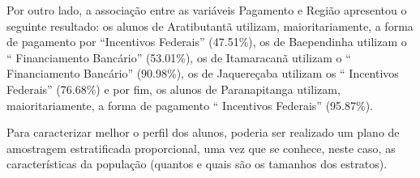 	Por outro lado, a associação entre as variáveis Pagamento e Região
	apresentou o seguinte resultado: os alunos de Aratibutantã utilizam,
	maioritariamente, a forma de pagamento por ``Incentivos Federais''
    (\num{47,51}\%), os de Baependinha utilizam o
	`` Financiamento Bancário'' (\num{53,01}\%), os
	de Itamaracanã utilizam o `` Financiamento Bancário'' 
    (\num{90,98}\%), os de Jaquereçaba utilizam os
	`` Incentivos Federais'' (\num{76,68}\%) e por
	fim, os alunos de Paranapitanga utilizam, maioritariamente, a forma de
	pagamento `` Incentivos Federais'' (\num{95,87}\%). 

	Para caracterizar melhor o perfil dos alunos, poderia ser realizado um
	plano de amostragem estratificada proporcional, uma vez que se conhece,
	neste caso, as características da população (quantos e quais são os
	tamanhos dos estratos). 
